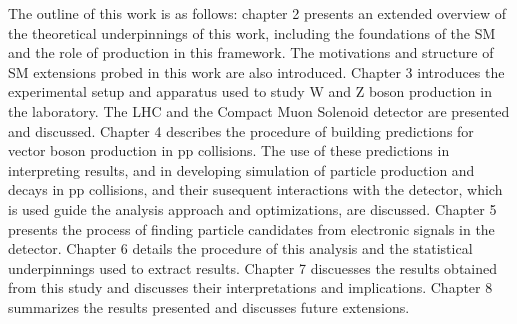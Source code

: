 The outline of this work is as follows: chapter 2 presents an extended 
overview of the theoretical underpinnings of this work, including the foundations
of the SM and the role of \EWWZ production in this framework. The motivations 
and structure of SM extensions probed in this work are also introduced.
Chapter 3 introduces the experimental setup and apparatus used to study W and 
Z boson production in the laboratory. The LHC and the Compact Muon Solenoid 
detector are presented and discussed. Chapter 4 describes the procedure of 
building predictions for vector boson production in pp collisions.
The use of these predictions in interpreting results, and in developing simulation
of particle production and decays in pp collisions, and their susequent interactions
with the detector, which is used 
guide the analysis approach and optimizations, are discussed. Chapter 5 presents
the process of finding particle candidates from electronic signals in the detector.
Chapter 6 details the procedure of this analysis and the statistical underpinnings
used to extract results. Chapter 7 discuesses the results obtained from this study
and discusses their interpretations and implications. Chapter 8 summarizes the
results presented and discusses future extensions.
